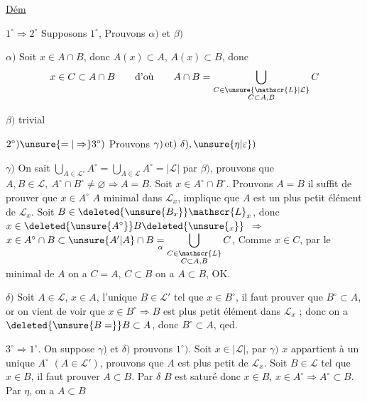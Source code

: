 \uline{Dém}

$1^\circ\Rightarrow 2^\circ$ \quad Supposons $1^\circ$, Prouvons $\alpha)$ et $\beta)$

$\alpha)$ Soit $x\in A\cap B$, donc $A(x)\subset A$, $A(x)\subset B$, donc
\[
 x\in C\subset A\cap B\qquad\text{d'où}\qquad A\cap B=
 \bigcup_{\substack{C\in\unsure{\mathscr{L}|\mathcal{L}}\\C\subset A,B}}C
\]

$\beta)$ trivial

$2^\circ)\unsure{=|\Rightarrow}3^\circ)$ \quad Prouvons $\gamma)\,\text{et})\ \delta),\unsure{\eta|\varepsilon})$

$\gamma)$ On sait $\displaystyle\bigcup_{A\in\mathscr{L}'}A^\circ=\bigcup_{A\in\mathscr{L}}A^\circ=|\mathscr{L}|$ par $\beta)$, prouvons que $A,B\in\mathscr{L},\ A^\circ\cap B^\circ\ne\varnothing\Rightarrow A=B$. Soit $x\in A^\circ\cap B^\circ$. Prouvons $A=B$ il suffit de prouver que $x\in A^\circ$   $A$ minimal dans $\mathscr{L}_x$, implique que $A$ est un plus petit élément de $\mathscr{L}_x$. Soit $B\in\deleted{\unsure{B_x}}\mathscr{L}_x$, donc $x\in\deleted{\unsure{A^\circ}}B\deleted{\unsure{{}_x}}$  $\Rightarrow$ $x\in A^\circ\cap B\subset\unsure{A'|A}\cap B\underset{\alpha}{=}\displaystyle\bigcup_{\substack{C\in\mathscr{L}\\C\subset A,B}} C$,
Comme $x\in C$, par le  minimal de $A$ on a $C=A$,  $C\subset B$ on a $A\subset B$, OK.

$\delta)$ Soit $A\in\mathscr{L}$, $x\in A$,    l'unique $B\in\mathscr{L}'$ tel que $x\in B^\circ$, il faut prouver que $B^\circ\subset A$, or on vient de voir que  $x\in B^\circ\Rightarrow B$ est plus petit élément dans $\mathscr{L}_x$ ; donc on a $\deleted{\unsure{B=}}B\subset A$, donc $B^\circ\subset A$, qed.


$3^\circ\Rightarrow1^\circ$. \quad On suppose $\gamma)$ et $\delta)$ prouvons $1^\circ)$. Soit $x\in|\mathscr{L}|$, par $\gamma)$ $x$ appartient à un unique $A^\circ$  $(A\in\mathscr{L}')$, prouvons que $A$ est plus petit  de $\mathscr{L}_x$. Soit $B\in\mathscr{L}$ tel que $x\in B$, il faut prouver $A\subset B$.  Par $\delta$ $B$ est saturé donc $x\in B$, $x\in A^\circ\Rightarrow A^\circ\subset B$.  Par $\eta$, on a $A\subset B$
